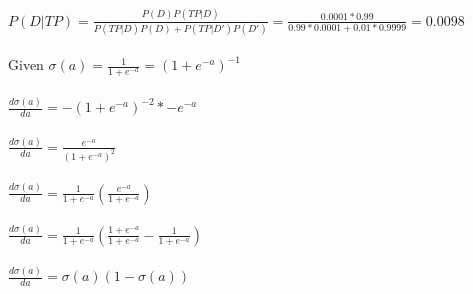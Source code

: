 \documentclass[12pt]{report}
\begin{document}
\\\\
$P(D|TP) = \frac{P(D)P(TP|D)}{P(TP|D)P(D)+P(TP|D')P(D')} = \frac{0.0001*0.99}{0.99*0.0001+0.01*0.9999} = 0.0098$
\newpage
{}
\\\\
Given $\sigma(a) = \frac{1}{1+e^{-a}} = (1+e^{-a})^{-1}$
\\\\
$\frac{d\sigma(a)}{da} = -(1+e^{-a})^{-2}*-e^{-a}$
\\\\
$\frac{d\sigma(a)}{da} = \frac{e^{-a}}{(1+e^{-a})^2}$
\\\\
$\frac{d\sigma(a)}{da} = \frac{1}{1+e^{-a}}\left(\frac{e^{-a}}{1+e^{-a}}\right)$
\\\\
$\frac{d\sigma(a)}{da} = \frac{1}{1+e^{-a}}\left(\frac{1+e^{-a}}{1+e^{-a}} - \frac{1}{1+e^{-a}}\right)$
\\\\
$\frac{d\sigma(a)}{da} = \sigma(a)\left(1-\sigma(a)\right)$
\end{document}
